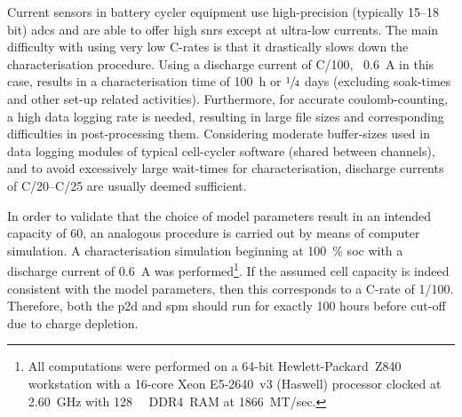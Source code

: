 Current sensors in battery cycler equipment use high-precision (typically 15--18
bit) \glspl{adc}  and are  able to  offer high  \glspl{snr} except  at ultra-low
currents. The main difficulty with using very low C-rates is that it drastically
slows down the  characterisation procedure. Using a discharge  current of C/100,
\ie~\SI{0.6}{\ampere} in  this case,  results in  a characterisation  time of
\SI{100}{\hour} or  $\sfrac{1}{4}$ days (excluding soak-times  and other
set-up related  activities). Furthermore, for accurate  coulomb-counting, a high
data logging  rate is needed,  resulting in  large file sizes  and corresponding
difficulties in post-processing them.  Considering moderate buffer-sizes used in
data logging modules of typical  cell-cycler software (shared between channels),
and  to  avoid  excessively  large wait-times  for  characterisation,  discharge
currents of C/20--C/25 are usually deemed sufficient.

In    order   to    validate    that   the    choice    of   model    parameters
result   in   an   intended   capacity  of   \SI{60}{\amphour},   an   analogous
procedure   is    carried   out   by    means   of   computer    simulation.   A
characterisation  simulation  beginning  at  \SI{100}{\percent}  \gls{soc}  with
a   discharge   current    of   \SI{0.6}{\ampere}   was   performed\footnote{All
computations  were  performed  on   a  64-bit  Hewlett-Packard~Z840  workstation
with   a   \mbox{16-core}   \mbox{\textsuperscript{\textregistered}}
\mbox{Xeon\textsuperscript{\textregistered}}     \mbox{E5-2640~v3}     (Haswell)
processor clocked  at \SI{2.60}{\giga\hertz} with  \SI{128}{\giga\byte} DDR4~RAM
at 1866~MT/sec.}.  If the assumed  cell capacity  is indeed consistent  with the
model parameters,  then this corresponds to  a C-rate of 1/100.  Therefore, both
the \gls{p2d} and \gls{spm} should run  for exactly 100 hours before cut-off due
to charge depletion.



